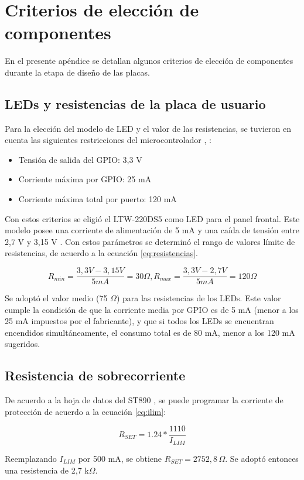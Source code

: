 
\chapter{Criterios de elección de componentes} %

\label{anexo:criterios} %

En el presente apéndice se detallan algunos criterios de elección de componentes durante la etapa de diseño de las placas.

\section{LEDs y resistencias de la placa de usuario}

Para la elección del modelo de LED y el valor de las resistencias, se tuvieron en cuenta las siguientes restricciones del microcontrolador \cite{st:stm32f413-ds}, \cite{st:stm32f413-rm}:
\begin{itemize}
	\item Tensión de salida del GPIO: 3,3 V
	\item Corriente máxima por GPIO: 25 mA
	\item Corriente máxima total por puerto: 120 mA
\end{itemize}

Con estos criterios se eligió el LTW-220DS5 como LED para el panel frontal. Este modelo posee una corriente de alimentación de 5 mA y una caída de tensión entre 2,7 V y 3,15 V \cite{liteon:ltw220ds5}. Con estos parámetros se determinó el rango de valores límite de resistencias, de acuerdo a la ecuación \ref{eq:resistencias}.

\begin{equation}
	\label{eq:resistencias}
	R_{min} = \frac{3{,}3 V - 3{,}15 V}{5 mA} = 30 \Omega, R_{max} = \frac{3{,}3 V - 2{,}7 V}{5 mA} = 120 \Omega
\end{equation}

Se adoptó el valor medio (75 $\Omega$) para las resistencias de los LEDs. Este valor cumple la condición de que la corriente media por GPIO es de 5 mA (menor a los 25 mA impuestos por el fabricante), y que si todos los LEDs se encuentran encendidos simultáneamente, el consumo total es de 80 mA, menor a los 120 mA sugeridos.


\section{Resistencia de sobrecorriente}
De acuerdo a la hoja de datos del ST890 \cite{st:st890}, se puede programar la corriente de protección de acuerdo a la ecuación \ref{eq:ilim}:

\begin{equation}
	\label{eq:ilim}
	R_{SET} = 1.24 * \frac{1110}{I_{LIM}}
\end{equation}

Reemplazando $I_{LIM}$ por 500 mA, se obtiene $R_{SET} = 2752{,}8\,\Omega$. Se adoptó entonces una resistencia de 2,7 k$\Omega$.
